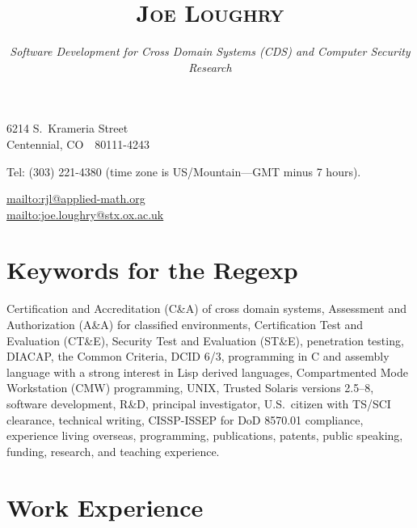 \documentclass[letterpaper]{article}
\date{}
\title{\textsc{Joe Loughry}\vspace{-3mm}}
\author{\vspace{-3mm}\emph{\spaceskip=0.825\fontdimen2\font Software Development 
	for Cross Domain Systems (CDS) and Computer Security Research}
}
\begin{document}
\maketitle

\vspace*{-12mm}
\hfill 6214 S.\ Krameria Street \\
\hfill Centennial, CO\ \ 80111-4243

Tel: (303) 221-4380 (time zone is US/Mountain---GMT minus 7 hours).

\vspace{1mm}
\url{mailto:rjl@applied-math.org} \\
\url{mailto:joe.loughry@stx.ox.ac.uk}

\vspace{-1mm}
\section*{Keywords for the Regexp}

Certification and Accreditation (C\&A) of cross domain systems,
Assessment and Authorization (A\&A) for classified environments,
Certification Test and Evaluation (CT\&E),
Security Test and Evaluation (ST\&E),
penetration testing,
DIACAP,
the Common Criteria,
DCID 6/3,
programming in C and assembly language with a strong interest in Lisp derived languages,
Compartmented Mode Workstation (CMW) programming,
UNIX,
Trusted Solaris versions 2.5--8,
software development,
R\&D,
principal investigator,
U.S.\ citizen with TS/SCI clearance,
technical writing,
CISSP-ISSEP for DoD 8570.01 compliance,
experience living overseas,
programming,
publications,
patents,
public speaking,
funding,
research,
and teaching experience.

\vspace{-1mm}
\section*{Work Experience}
\end{document}
